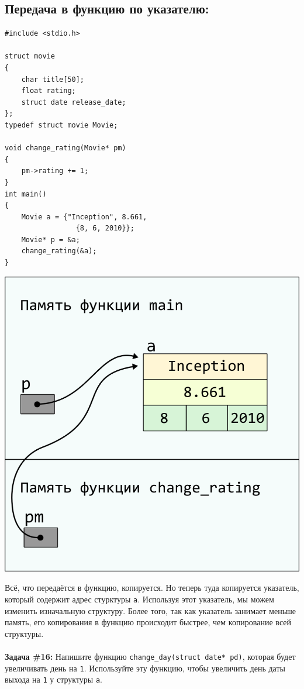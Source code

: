 \documentclass{article}
\begin{document}
\subsection*{Передача в функцию по указателю:}
\begin{multicols}{2}
\begin{lstlisting}
#include <stdio.h>

struct movie
{
	char title[50];
	float rating;
	struct date release_date;
};
typedef struct movie Movie;

void change_rating(Movie* pm)
{
	pm->rating += 1;
}
int main()
{
	Movie a = {"Inception", 8.661, 
	             {8, 6, 2010}};
	Movie* p = &a;
	change_rating(&a);
}
\end{lstlisting}
\columnbreak
\begin{center}
\includegraphics[scale=1]{../images/pointer_schemes/function_by_pointer.png}
\end{center}
\end{multicols}
Всё, что передаётся в функцию, копируется. Но теперь туда копируется указатель, который содержит
адрес стурктуры \texttt{a}. Используя этот указатель, мы можем изменить изначальную структуру. Более того, так как указатель занимает меньше память, его копирования в функцию происходит быстрее, чем копирование всей структуры.\\\\
\textbf{Задача \#16:} Напишите функцию \texttt{change\_day(struct date* pd)}, которая будет увеличивать день на \texttt{1}. Используйте эту функцию, чтобы увеличить день даты выхода на \texttt{1} у структуры \texttt{a}.\\
\newpage
\end{document}
